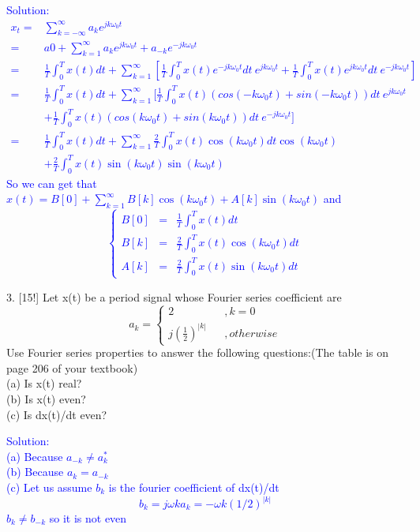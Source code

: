 \documentclass[12pt,a4paper]{article}
\begin{document}
\begin{tcolorbox}
\normalsize
\textcolor{blue}{Solution:\\
$$
\begin{aligned}
    x_t=&\sum_{k=-\infty}^{\infty}a_k e^{j k\omega_0t}\\
    =&a0+\sum_{k=1}^{\infty}a_k e^{j k\omega_0t}+a_{-k} e^{-j k\omega_0t}\\
    =&\frac{1}{T}\int_0^T x(t)dt+\sum_{k=1}^{\infty}[\frac{1}{T}\int_0^Tx(t)e^{-jk\omega_0t}dt~e^{j k\omega_0t}+\frac{1}{T}\int_0^Tx(t)e^{jk\omega_0t}dt~e^{-j k\omega_0t}]\\
    =&\frac{1}{T}\int_0^T x(t)dt+\sum_{k=1}^{\infty}[\frac{1}{T}\int_0^Tx(t)(cos(-k\omega_0 t)+sin(-k\omega_0 t))dt~e^{j k\omega_0t}\\
    &+\frac{1}{T}\int_0^Tx(t)(cos(k\omega_0 t)+sin(k\omega_0 t))dt~e^{-j k\omega_0t}]\\
    =&\frac{1}{T}\int_0^T x(t)dt +\sum_{k=1}^\infty \frac{2}{T}\int_0^T x(t)\cos{(k\omega_0t)}dt\cos{(k\omega_0t)}\\
    &+\frac{2}{T}\int_0^T x(t)\sin{(k\omega_0t)}\sin{(k\omega_0t)}
\end{aligned}
$$
So we can get that $x(t)=B[0] +\sum_{k=1}^\infty B[k]\cos{(k\omega_0t)}+A[k]\sin{(k\omega_0t)}$ and
$$ \left\{
\begin{aligned}
B[0] & = & \frac{1}{T}\int_0^T x(t)dt \\
B[k] & = & \frac{2}{T}\int_0^T x(t)\cos{(k\omega_0t)}dt \\
A[k] & = & \frac{2}{T}\int_0^T x(t)\sin{(k\omega_0t)}dt
\end{aligned}
\right.
$$
}
\end{tcolorbox}


\begin{tcolorbox}[colback = white]
3. [15!] Let x(t) be a period signal whose Fourier series coefficient are\\
$$ a_k=\left\{
\begin{array}{rcl}
2 & & ,k=0\\
j(\frac{1}{2})^{|k|}& &,otherwise
\end{array} \right.
$$
Use Fourier series properties to answer the following questions:(The table is on page 206 of your textbook)\\
(a) Is x(t) real?\\
(b) Is x(t) even?\\
(c) Is dx(t)/dt even?
\end{tcolorbox}

\begin{tcolorbox}
\normalsize
\textcolor{blue}{Solution:\\
(a)  Because $a_{-k}\neq a_k^*$\\
(b)  Because $a_k=a_{-k}$\\
(c)  Let us assume $b_k$ is the fourier coefficient of dx(t)/dt\\
$$
b_k=j\omega k a_k=-\omega k (1/2)^{|k|}
$$
$b_k\neq b_{-k}$ so it is not even
}
\end{tcolorbox}
\end{document}
